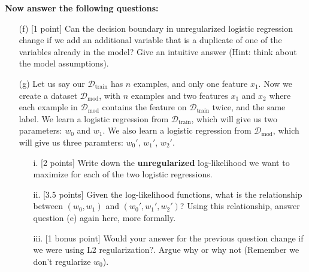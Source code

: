 \documentclass[12pt]{article}
\begin{document}
{\textbf{Now answer the following questions:}
\begin{itemize}
  \item[{(f)}] [1 point]  Can the decision boundary in unregularized logistic regression
  change if we add an additional variable that is a duplicate of one of the
  variables already in the model?
  Give an intuitive answer (Hint: think about the model assumptions).
  \item[{(g)}] Let us say our $\mathcal{D}_{\textrm{train}}$ has $n$ examples,
  and only one feature $x_1$. Now we create a dataset
  $\mathcal{D}_{\textrm{mod}}$, with $n$ examples and two features $x_1$ and
  $x_2$ where each example in $\mathcal{D}_{\textrm{mod}}$ contains the feature
  on $\mathcal{D}_{\textrm{train}}$ twice, and the same label. We learn a
  logistic regression from $\mathcal{D}_{\textrm{train}}$, which will give us
  two parameters: $w_0$ and $w_1$. We also learn a logistic regression from
  $\mathcal{D}_{\textrm{mod}}$, which will give us three paramters: $w_0'$,
  $w_1'$, $w_2'$.

  \begin{itemize}
  \item[i.] [2 points] Write down the \textbf{unregularized} log-likelihood we want to maximize for each of the
  two logistic regressions.
  \item[ii.] [3.5 points] Given the log-likelihood functions, what is the relationship
  between $(w_0, w_1)$ and $(w_0', w_1', w_2')$? Using this relationship, answer
  question (e) again here, more formally.
  \item[iii.] [1 bonus point] Would your answer for the previous question change if we were
  using L2 regularization?. Argue why or why not (Remember we don't regularize $w_0$).
  \end{itemize}
\end{itemize}
}
\end{document}

